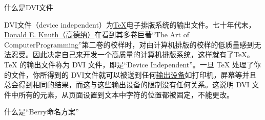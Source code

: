 \begin{faq}{什么是DVI文件}

  DVI文件（device independent）为\href{https://baike.baidu.com/item/TeX}{TeX}电子排版系统的输出文件。七十年代末，\href{https://baike.baidu.com/item/Donald%20E.%20Knuth}{Donald E. Knuth（高德纳）}在看到其多卷巨著“The Art of ComputerProgramming”第二卷的校样时，对由计算机排版的校样的低质量感到无法忍受。因此决定自己来开发一个高质量的计算机排版系统，这样就有了TeX。TeX 的输出文件称为 DVI 文件，即是“Device Independent”。一旦 TeX 处理了你的文件，你所得到的 DVI文件就可以被送到任何\href{https://baike.baidu.com/item/%E8%BE%93%E5%87%BA%E8%AE%BE%E5%A4%87}{输出设备}如打印机，屏幕等并且总会得到相同的结果，而这与这些输出设备的限制没有任何关系。这说明 DVI 文件中所有的元素，从页面设置到文本中字符的位置都被固定，不能更改。

\end{faq}

%

\begin{faq}{什么是“Berry命名方案”}
\end{faq}

